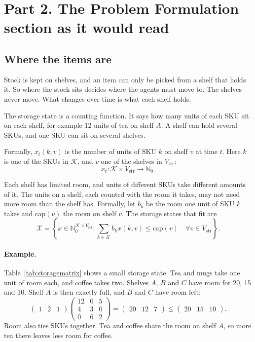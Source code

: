 \documentclass[11pt,a4paper]{article}
\begin{document}
\clearpage
\section*{Part 2. The Problem Formulation section as it would read}
\subsection{Where the items are}
\label{sec:pf:storage}

Stock is kept on shelves, and an item can only be picked from a shelf that
holds it. So where the stock sits decides where the agents must move to.
The shelves never move. What changes over time is what each shelf holds.

The storage state is a counting function. It says how many units of each
SKU sit on each shelf, for example 12 units of tea on shelf $A$. A shelf
can hold several SKUs, and one SKU can sit on several shelves.

Formally, $x_t(k,v)$ is the number of units of SKU $k$ on shelf $v$ at
time $t$. Here $k$ is one of the SKUs in $\mathcal{K}$, and $v$ one of the
shelves in $V_{\mathrm{str}}$:
\begin{equation}
x_t:\mathcal{K}\times V_{\mathrm{str}}\to\mathbb{N}_0 .
\label{eq:storagestate}
\end{equation}

Each shelf has limited room, and units of different SKUs take different
amounts of it. The units on a shelf, each counted with the room it takes,
may not need more room than the shelf has. Formally, let $b_k$ be the room
one unit of SKU $k$ takes and $\mathrm{cap}(v)$ the room on shelf $v$. The
storage states that fit are
\begin{equation}
\mathcal{X}=
\left\{
x\in\mathbb{N}_0^{\mathcal{K}\times V_{\mathrm{str}}}:
\sum_{k\in \mathcal{K}}b_kx(k,v)\le\mathrm{cap}(v)
\quad\forall v\in V_{\mathrm{str}}
\right\}.
\label{eq:feasiblestorage}
\end{equation}

\paragraph{Example.}
Table~\ref{tab:storagematrix} shows a small storage state. Tea and mugs
take one unit of room each, and coffee takes two. Shelves $A$, $B$ and $C$
have room for 20, 15 and 10. Shelf $A$ is then exactly full, and $B$ and
$C$ have room left:
\[
\begin{pmatrix}
1&2&1
\end{pmatrix}
\begin{pmatrix}
12&0&5\\
4&3&0\\
0&6&2
\end{pmatrix}
=
\begin{pmatrix}
20&12&7
\end{pmatrix}
\le
\begin{pmatrix}
20&15&10
\end{pmatrix}.
\]
Room also ties SKUs together. Tea and coffee share the room on shelf $A$,
so more tea there leaves less room for coffee.
\end{document}
